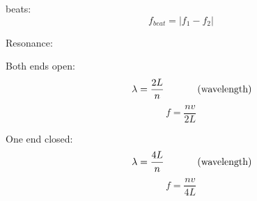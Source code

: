 \documentclass[11pt]{article}
\begin{document}
    \noindent beats:
    \begin{equation}
        f_{beat} = \left |f_1 - f_2 \tag{beat frequency} \right|
    \end{equation}

    \noindent Resonance:

    \begin{minipage}[t]{0.5\textwidth}
        \noindent Both ends open:
    \begin{align}
        \hspace*{0.8cm} \lambda = \frac{2L}{n} \hspace{0.5cm} \tag{wavelength}
    \end{align}
    \begin{equation}
        f = \frac{nv}{2L} \tag{resonance}
    \end{equation}
    \end{minipage}
    \begin{minipage}[t]{0.5\textwidth}
        \noindent One end closed:
        \begin{align}
            \hspace*{0.8cm} \lambda = \frac{4L}{n} \hspace{0.5cm} \tag{wavelength}
        \end{align}
        \begin{equation}
            f = \frac{nv}{4L} \tag{resonance}
        \end{equation}
        \end{minipage}
\end{document}
